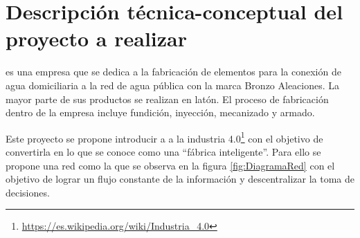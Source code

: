 \documentclass[11pt]{charter}
\begin{document}
\section{Descripción técnica-conceptual del proyecto a realizar}
\label{sec:descripcion}


\empclientename es una empresa que se dedica a la fabricación de elementos para la conexión de agua domiciliaria a la red de agua pública con la marca Bronzo Aleaciones. La mayor parte de sus productos se realizan en latón. El proceso de fabricación dentro de la empresa incluye fundición, inyección, mecanizado y armado.

Este proyecto se propone introducir a \empclientename a la industria 4.0\footnote{\url{https://es.wikipedia.org/wiki/Industria_4.0}} con el objetivo de convertirla en lo que se conoce como una ``fábrica inteligente''. Para ello se propone una red como la que se observa en la figura \ref{fig:DiagramaRed} con el objetivo de lograr un flujo constante de la información y descentralizar la toma de decisiones.



\end{document}
